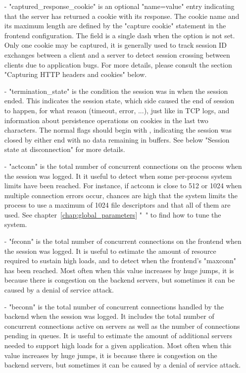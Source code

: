 \begin{itemize}
\item[-]
    "captured\_response\_cookie" is an optional "name=value" entry indicating
    that the server has returned a cookie with its response. The cookie name
    and its maximum length are defined by the "capture cookie" statement in the
    frontend configuration. The field is a single dash \chr{-} when the option is
    not set. Only one cookie may be captured, it is generally used to track
    session ID exchanges between a client and a server to detect session
    crossing between clients due to application bugs. For more details, please
    consult the section "Capturing HTTP headers and cookies" below.

\item[-]
    "termination\_state" is the condition the session was in when the session
    ended. This indicates the session state, which side caused the end of
    session to happen, for what reason (timeout, error, ...), just like in TCP
    logs, and information about persistence operations on cookies in the last
    two characters. The normal flags should begin with \chr{{-}{-}}, indicating the
    session was closed by either end with no data remaining in buffers. See
    below "Session state at disconnection" for more details.

\item[-]
    "actconn" is the total number of concurrent connections on the process when
    the session was logged. It it useful to detect when some per-process system
    limits have been reached. For instance, if actconn is close to 512 or 1024
    when multiple connection errors occur, chances are high that the system
    limits the process to use a maximum of 1024 file descriptors and that all
    of them are used. See chapter~\ref{chap:global_parameters}
    "~" to find how to tune the
    system.

\item[-]
    "feconn" is the total number of concurrent connections on the frontend when
    the session was logged. It is useful to estimate the amount of resource
    required to sustain high loads, and to detect when the frontend's "maxconn"
    has been reached. Most often when this value increases by huge jumps, it is
    because there is congestion on the backend servers, but sometimes it can be
    caused by a denial of service attack.

\item[-]
    "beconn" is the total number of concurrent connections handled by the
    backend when the session was logged. It includes the total number of
    concurrent connections active on servers as well as the number of
    connections pending in queues. It is useful to estimate the amount of
    additional servers needed to support high loads for a given application.
    Most often when this value increases by huge jumps, it is because there is
    congestion on the backend servers, but sometimes it can be caused by a
    denial of service attack.


\end{itemize}
